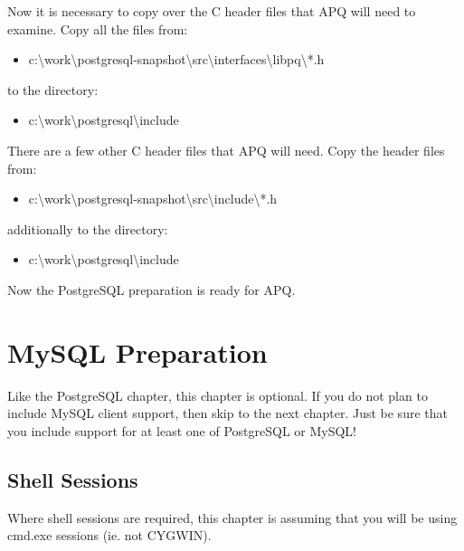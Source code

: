 \documentclass[english]{report}
\newenvironment{lyxcode}
   {\begin{list}{}{
     \setlength{\rightmargin}{\leftmargin}
     \setlength{\listparindent}{0pt}%
     \raggedright
     \setlength{\itemsep}{0pt}
     \setlength{\parsep}{0pt}
     \normalfont\ttfamily}%
    \item[]}
   {\end{list}}
\begin{document}
Now it is necessary to copy over the C header files that APQ will
need to examine. Copy all the files from:

\begin{itemize}
\item c:\textbackslash{}work\textbackslash{}postgresql-snapshot\textbackslash{}src\textbackslash{}interfaces\textbackslash{}libpq\textbackslash{}{*}.h
\end{itemize}
to the directory:

\begin{itemize}
\item c:\textbackslash{}work\textbackslash{}postgresql\textbackslash{}include
\end{itemize}
\begin{lyxcode}

\end{lyxcode}
There are a few other C header files that APQ will need. Copy the
header files from:

\begin{itemize}
\item c:\textbackslash{}work\textbackslash{}postgresql-snapshot\textbackslash{}src\textbackslash{}include\textbackslash{}{*}.h
\end{itemize}
additionally to the directory:

\begin{itemize}
\item c:\textbackslash{}work\textbackslash{}postgresql\textbackslash{}include
\end{itemize}
\begin{lyxcode}

\end{lyxcode}
Now the PostgreSQL preparation is ready for APQ.


\chapter{MySQL Preparation}

Like the PostgreSQL chapter, this chapter is optional. If you do not
plan to include MySQL client support, then skip to the next chapter.
Just be sure that you include support for at least one of PostgreSQL
or MySQL!


\section{Shell Sessions}

Where shell sessions are required, this chapter is assuming that you
will be using cmd.exe sessions (ie. not CYGWIN).
\end{document}
